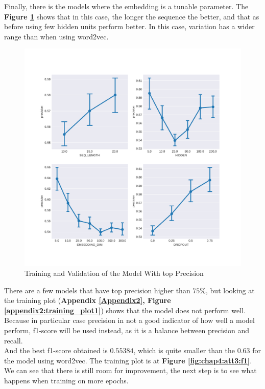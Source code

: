 Finally, there is the models where the embedding is a tunable parameter. The \textbf{Figure \ref{fig:chap4:att3:confInt2}} shows that in this case, the longer the sequence the better, and that as before using few hidden units perform better. In this case, variation has a wider range than when using word2vec. 
\begin{figure}
 \centering
 \includegraphics[width=\textwidth]{images/chapitre4/confInt_precision_liar_attention_200}
 \caption{Training and Validation of the Model With top Precision}
 \label{fig:chap4:att3:confInt2}
\end{figure}
There are a few models that have top precision higher than $75\%$, but looking at the training plot (\textbf{Appendix \ref{Appendix2}, Figure \ref{appendix2:training_plot1}}) shows that the model does not perform well. Because in particular case precision in not a good indicator of how well a model perform, f1-score will be used instead, as it is a balance between precision and recall. \\
And the best f1-score obtained is $0.55384$, which is quite smaller than the $0.63$ for the model using word2vec. The training plot is at \textbf{Figure \ref{fig:chap4:att3:f1}}. We can see that there is still room for improvement, the next step is to see what happens when training on more epochs. \\
